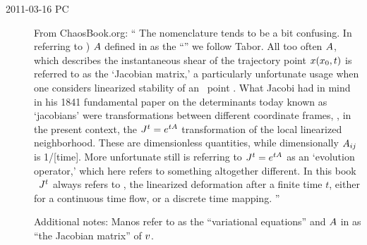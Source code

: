 \begin{description}
\item[2011-03-16 PC] From ChaosBook.org: ``
The nomenclature tends to be a bit confusing.
In referring to \velgradmat) ${A}$ defined in 
as the {``\stabmat''} we follow Tabor.
												\toCB
All too often ${A}$,
which describes the instantaneous shear of the trajectory
point $x({x_0},t)$ is referred to as the `Jacobian
matrix,'
a particularly unfortunate usage when one considers
linearized stability of an \eqv\ point .
What Jacobi had in mind in his
1841 fundamental paper on the determinants today known as
`jacobians' were transformations between different coordinate frames,
\ie, in the present context, the
$J^{t} = e^{t {A}}$ transformation of the local linearized
neighborhood.
These are dimensionless quantities,
while dim\-ens\-ion\-ally ${A}_{ij}$ is 1/[time].
More unfortunate still is referring to
$J^{t} = e^{t {A}}$ as an `evolution operator,' which here
refers to something altogether different.
In this book
\jacobianM\ $J^{t}$ always refers to
,
the linearized deformation after a finite time $t$, either for a
continuous time flow, or a discrete time mapping.
''

												\toCB
Additional notes:
Manos \etal{} refer to 
as the ``variational equations'' and
$A$ in  as ``the Jacobian matrix'' of  $v$.


\end{description}
